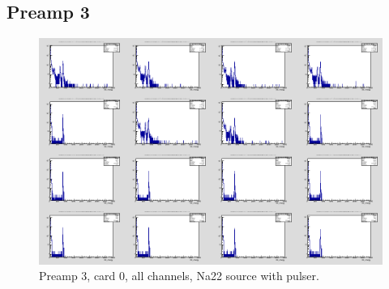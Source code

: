 \documentclass{report}
\begin{document}
\subsection{Preamp 3}
\begin{figure}[!htb]
  \includegraphics[width=\linewidth]{preamp3_lim_energy_card0_all.png}
  \caption{Preamp 3, card 0, all channels, Na22 source  with pulser.}
\end{figure}
\end{document}
